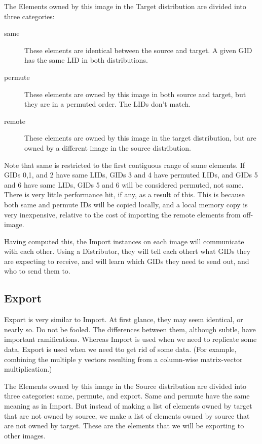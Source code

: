 \documentclass[10pt,relax]{TpetraDesign}
\begin{document}
The Elements owned by this image in the Target distribution are divided into three categories:
\begin{description}
\item[same] These elements are identical between the source and target. A given GID has the same LID in both distributions. 

\item[permute] These elements are owned by this image in both source and target, but they are in a permuted order. The LIDs don't match.

\item[remote] These elements are owned by this image in the target distribution, but are owned by a different image in the source distribution.
\end{description}

Note that same is restricted to the first contiguous range of same elements. If GIDs 0,1, and 2 have same LIDs, GIDs 3 and 4 have permuted LIDs, and GIDs 5 and 6 have same LIDs, GIDs 5 and 6 will be considered permuted, not same. There is very little performance hit, if any, as a result of this. This is because both same and permute IDs will be copied locally, and a local memory copy is very inexpensive, relative to the cost of importing the remote elements from off-image.

Having computed this, the Import instances on each image will communicate with each other. Using a Distributor, they will tell each othert what GIDs they are expecting to receive, and will learn which GIDs they need to send out, and who to send them to.


%
\subsection{Export}

Export is very similar to Import. At first glance, they may seem identical, or nearly so. Do not be fooled. The differences between them, although subtle, have important ramifications. Whereas Import is used when we need to replicate some data, Export is used when we need tto get rid of some data. (For example, combining the multiple y vectors resulting from a column-wise matrix-vector multiplication.)

The Elements owned by this image in the Source distribution are divided into three categories: same, permute, and export. Same and permute have the same meaning as in Import. But instead of making a list of elements owned by target that are not owned by source, we make a list of elements owned by source that are not owned by target. These are the elements that we will be exporting to other images.
\end{document}
